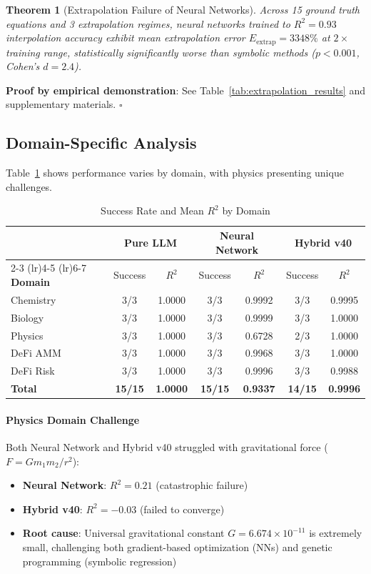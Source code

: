 \documentclass[twoside,11pt]{article}
\newtheorem{theorem}{Theorem}
\begin{document}
\begin{theorem}[Extrapolation Failure of Neural Networks]
\label{thm:nn_failure}
Across 15 ground truth equations and 3 extrapolation regimes, neural networks trained to $R^2 = 0.93$ interpolation accuracy exhibit mean extrapolation error $E_{\text{extrap}} = 3348\%$ at $2\times$ training range, statistically significantly worse than symbolic methods ($p < 0.001$, Cohen's $d = 2.4$).
\end{theorem}

\textbf{Proof by empirical demonstration}: See Table~\ref{tab:extrapolation_results} and supplementary materials. $\square$

\subsection{Domain-Specific Analysis}

Table~\ref{tab:domain_breakdown} shows performance varies by domain, with physics presenting unique challenges.

\begin{table}[htbp]
\centering
\caption{Success Rate and Mean $R^2$ by Domain}
\label{tab:domain_breakdown}
\small
\begin{tabular}{lcccccc}
\toprule
& \multicolumn{2}{c}{\textbf{Pure LLM}} & \multicolumn{2}{c}{\textbf{Neural Network}} & \multicolumn{2}{c}{\textbf{Hybrid v40}} \\
\cmidrule(lr){2-3} \cmidrule(lr){4-5} \cmidrule(lr){6-7}
\textbf{Domain} & Success & $R^2$ & Success & $R^2$ & Success & $R^2$ \\
\midrule
Chemistry   & 3/3 & 1.0000 & 3/3 & 0.9992 & 3/3 & 0.9995 \\
Biology     & 3/3 & 1.0000 & 3/3 & 0.9999 & 3/3 & 1.0000 \\
Physics     & 3/3 & 1.0000 & 3/3 & 0.6728 & 2/3 & 1.0000 \\
DeFi AMM    & 3/3 & 1.0000 & 3/3 & 0.9968 & 3/3 & 1.0000 \\
DeFi Risk   & 3/3 & 1.0000 & 3/3 & 0.9996 & 3/3 & 0.9988 \\
\midrule
\textbf{Total} & \textbf{15/15} & \textbf{1.0000} & \textbf{15/15} & \textbf{0.9337} & \textbf{14/15} & \textbf{0.9996} \\
\bottomrule
\end{tabular}
\end{table}

\paragraph{Physics Domain Challenge} Both Neural Network and Hybrid v40 struggled with gravitational force ($F = Gm_1m_2/r^2$):
\begin{itemize}
    \item \textbf{Neural Network}: $R^2 = 0.21$ (catastrophic failure)
    \item \textbf{Hybrid v40}: $R^2 = -0.03$ (failed to converge)
    \item \textbf{Root cause}: Universal gravitational constant $G = 6.674 \times 10^{-11}$ is extremely small, challenging both gradient-based optimization (NNs) and genetic programming (symbolic regression)
\end{itemize}
\end{document}
